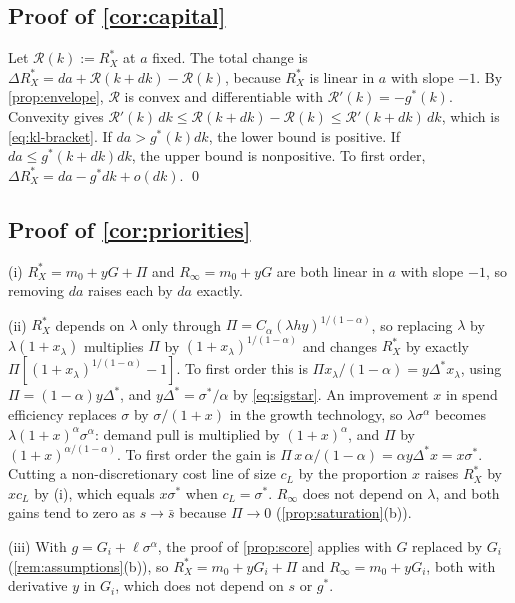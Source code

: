 \subsection*{Proof of \autoref{cor:capital}}

Let $\mathcal R(k):=R_X^*$ at $a$ fixed. The total change is $\Delta R_X^*=da+\mathcal R(k+dk)-\mathcal R(k)$, because $R_X^*$ is linear in $a$ with slope $-1$. By \autoref{prop:envelope}, $\mathcal R$ is convex and differentiable with $\mathcal R'(k)=-g^*(k)$. Convexity gives $\mathcal R'(k)\,dk\le\mathcal R(k+dk)-\mathcal R(k)\le\mathcal R'(k+dk)\,dk$, which is \eqref{eq:kl-bracket}. If $da>g^*(k)dk$, the lower bound is positive. If $da\le g^*(k+dk)dk$, the upper bound is nonpositive. To first order, $\Delta R_X^*=da-g^*dk+o(dk)$. \qed

\subsection*{Proof of \autoref{cor:priorities}}

(i) $R_X^*=m_0+yG+\Pi$ and $R_\infty=m_0+yG$ are both linear in $a$ with slope $-1$, so removing $da$ raises each by $da$ exactly.

(ii) $R_X^*$ depends on $\lambda$ only through $\Pi=C_\alpha(\lambda hy)^{1/(1-\alpha)}$, so replacing $\lambda$ by $\lambda(1+x_\lambda)$ multiplies $\Pi$ by $(1+x_\lambda)^{1/(1-\alpha)}$ and changes $R_X^*$ by exactly $\Pi[(1+x_\lambda)^{1/(1-\alpha)}-1]$. To first order this is $\Pi x_\lambda/(1-\alpha)=y\Delta^*x_\lambda$, using $\Pi=(1-\alpha)y\Delta^*$, and $y\Delta^*=\sigma^*/\alpha$ by \eqref{eq:sigstar}. An improvement $x$ in spend efficiency replaces $\sigma$ by $\sigma/(1+x)$ in the growth technology, so $\lambda\sigma^\alpha$ becomes $\lambda(1+x)^\alpha\sigma^\alpha$: demand pull is multiplied by $(1+x)^\alpha$, and $\Pi$ by $(1+x)^{\alpha/(1-\alpha)}$. To first order the gain is $\Pi\,x\,\alpha/(1-\alpha)=\alpha y\Delta^*x=x\sigma^*$. Cutting a non-discretionary cost line of size $c_L$ by the proportion $x$ raises $R_X^*$ by $xc_L$ by (i), which equals $x\sigma^*$ when $c_L=\sigma^*$. $R_\infty$ does not depend on $\lambda$, and both gains tend to zero as $s\to\bar s$ because $\Pi\to 0$ (\autoref{prop:saturation}(b)).

(iii) With $g=G_i+\ell\sigma^{\alpha}$, the proof of \autoref{prop:score} applies with $G$ replaced by $G_i$ (\autoref{rem:assumptions}(b)), so $R_X^*=m_0+yG_i+\Pi$ and $R_\infty=m_0+yG_i$, both with derivative $y$ in $G_i$, which does not depend on $s$ or $g^*$.

